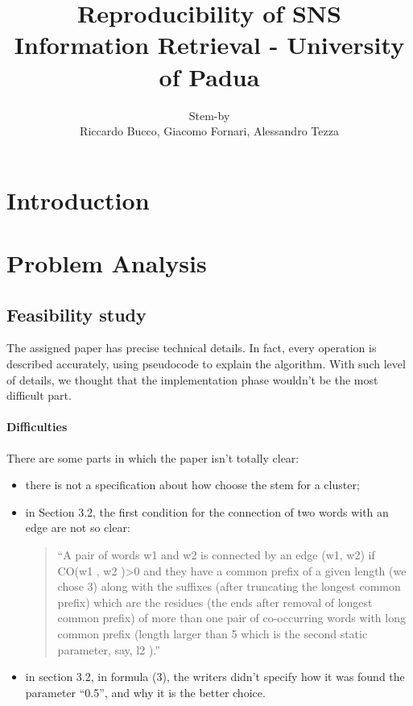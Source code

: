 \documentclass[10pt,a4paper]{article}
\author{Stem-by\\Riccardo Bucco, Giacomo Fornari, Alessandro Tezza}
\title{Reproducibility of SNS \\Information Retrieval - University of Padua}
\begin{document}
\maketitle
\section{Introduction}

\section{Problem Analysis}
\subsection{Feasibility study}
The assigned paper has precise technical details. In fact, every operation is described accurately, using pseudocode to explain the algorithm. With such level of details, we thought that the implementation phase wouldn't be the most difficult part. 	
\paragraph{Difficulties}
There are some parts in which the paper isn't totally clear:
\begin{itemize}
\item there is not a specification about how choose the stem for a cluster;
\item in Section 3.2, the first condition for the connection of two words with an edge are not so clear: 
\begin{quotation}
``A pair of words w1 and w2 is connected by an edge (w1, w2) if CO(w1 , w2 )\textgreater 0 and they have a common prefix of a given length (we chose 3) along with the suffixes (after truncating the longest common prefix) which are the residues (the ends after removal of longest common prefix) of more than one pair of co-occurring words with long common prefix (length larger than 5 which is the second static parameter, say, l2 ).''
\end{quotation}

\item in section 3.2, in formula (3), the writers didn't specify how it was found the parameter ``0.5'', and why it is the better choice.
\end{itemize}
\end{document}
